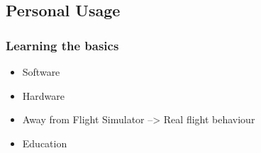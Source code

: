\subsection{Personal Usage}

\begin{frame}
\frametitle{Learning the basics}

  \begin{itemize}
    \item Software
    \item Hardware
    \item Away from Flight Simulator --> Real flight behaviour
    \item Education
  \end{itemize}
  
\end{frame}



%
%    


